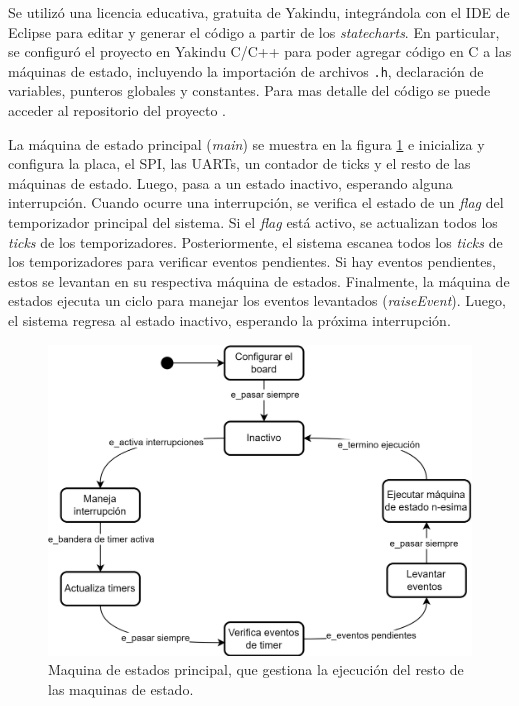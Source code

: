 Se utilizó una licencia educativa, gratuita de Yakindu, integrándola con el IDE de Eclipse para editar y generar el código a partir de los \textit{statecharts}. En particular, se configuró el proyecto en Yakindu C/C++ para poder agregar código en C a las máquinas de estado, incluyendo la importación de archivos \texttt{.h}, declaración de variables, punteros globales y constantes. Para mas detalle del código se puede acceder al repositorio del proyecto \cite{FirmwareSCA2024}.

La máquina de estado principal (\textit{main}) se muestra en la figura \ref{fig:sc_main} e inicializa y configura la placa, el SPI, las UARTs, un contador de ticks y el resto de las máquinas de estado. Luego, pasa a un estado inactivo, esperando alguna interrupción. Cuando ocurre una interrupción, se verifica el estado de un \textit{flag} del temporizador principal del sistema. Si el \textit{flag} está activo, se actualizan todos los \textit{ticks} de los temporizadores. Posteriormente, el sistema escanea todos los \textit{ticks} de los temporizadores para verificar eventos pendientes. Si hay eventos pendientes, estos se levantan en su respectiva máquina de estados. Finalmente, la máquina de estados ejecuta un ciclo para manejar los eventos levantados (\textit{raiseEvent}). Luego, el sistema regresa al estado inactivo, esperando la próxima interrupción.

\begin{figure}[H]
    \centering
    \includegraphics[width=0.65\linewidth]{Figuras/datalogger/Firmware/sc_main.png}
    \caption{Maquina de estados principal, que gestiona la ejecución del resto de las maquinas de estado.}
    \label{fig:sc_main}
\end{figure}



